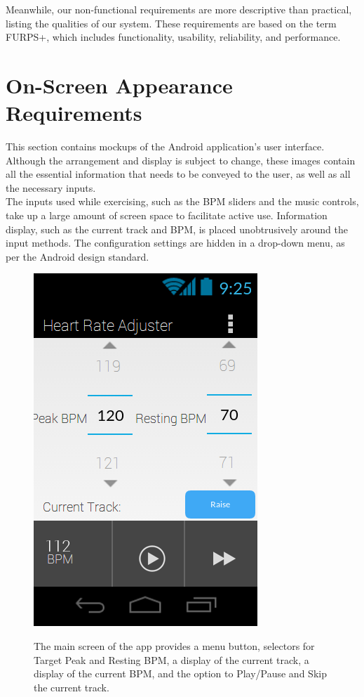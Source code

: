 \documentclass[letterpaper,english, 12pt]{scrreprt}
\begin{document}
Meanwhile, our non-functional requirements are more descriptive than practical,
listing the qualities of our system. These requirements are based on the term
FURPS+, which includes functionality, usability, reliability, and performance.

\section{On-Screen Appearance Requirements}

This section contains mockups of the Android application's user interface.
Although the arrangement and display is subject to change, these images contain all the essential information that needs to be conveyed to the user, as well as all the necessary inputs. \\
The inputs used while exercising, such as the BPM sliders and the music controls, take up a large amount of screen space to facilitate active use. Information display, such as the current track and BPM, is placed unobtrusively around the input methods. The configuration settings are hidden in a drop-down menu, as per the Android design standard.\\

\begin{figure}[H]
	\centering
	\includegraphics{img/mobile_ui/1.png}\\
	\caption{The main screen of the app provides a menu button, selectors for Target Peak and Resting BPM, a display of the current track, a display of the current BPM, and the option to Play/Pause and Skip the current track.}
\end{figure}
\end{document}
